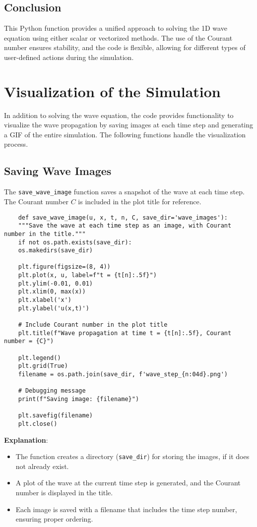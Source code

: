 \documentclass[a4paper, 11pt]{article}
\begin{document}
	\subsection{Conclusion}
	
	This Python function provides a unified approach to solving the 1D wave equation using either scalar or vectorized methods. The use of the Courant number ensures stability, and the code is flexible, allowing for different types of user-defined actions during the simulation.

\section{Visualization of the Simulation}

In addition to solving the wave equation, the code provides functionality to visualize the wave propagation by saving images at each time step and generating a GIF of the entire simulation. The following functions handle the visualization process.

\subsection{Saving Wave Images}

The \texttt{save\_wave\_image} function saves a snapshot of the wave at each time step. The Courant number $C$ is included in the plot title for reference.

\lstset{language=Python}
\begin{lstlisting}
	def save_wave_image(u, x, t, n, C, save_dir='wave_images'):
	"""Save the wave at each time step as an image, with Courant number in the title."""
	if not os.path.exists(save_dir):
	os.makedirs(save_dir)
	
	plt.figure(figsize=(8, 4))
	plt.plot(x, u, label=f"t = {t[n]:.5f}")
	plt.ylim(-0.01, 0.01)
	plt.xlim(0, max(x))
	plt.xlabel('x')
	plt.ylabel('u(x,t)')
	
	# Include Courant number in the plot title
	plt.title(f"Wave propagation at time t = {t[n]:.5f}, Courant number = {C}")
	
	plt.legend()
	plt.grid(True)
	filename = os.path.join(save_dir, f'wave_step_{n:04d}.png')
	
	# Debugging message
	print(f"Saving image: {filename}")
	
	plt.savefig(filename)
	plt.close()
\end{lstlisting}

\textbf{Explanation}:
\begin{itemize}
	\item The function creates a directory (\texttt{save\_dir}) for storing the images, if it does not already exist.
	\item A plot of the wave at the current time step is generated, and the Courant number is displayed in the title.
	\item Each image is saved with a filename that includes the time step number, ensuring proper ordering.
\end{itemize}
\end{document}
